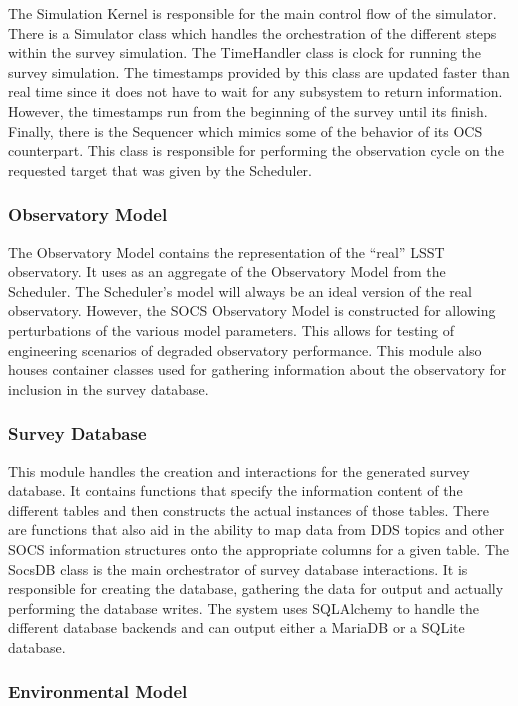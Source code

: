 \documentclass[]{spie}  %
\begin{document}
The Simulation Kernel is responsible for the main control flow of the simulator. There is a Simulator class which handles the orchestration of the different steps within the survey simulation. The TimeHandler class is clock for running the survey simulation. The timestamps provided by this class are updated faster than real time since it does not have to wait for any subsystem to return information. However, the timestamps run from the beginning of the survey until its finish. Finally, there is the Sequencer which mimics some of the behavior of its OCS counterpart. This class is responsible for performing the observation cycle on the requested target that was given by the Scheduler. 

\subsubsection{Observatory Model}

The Observatory Model contains the representation of the ``real'' LSST observatory. It uses as an aggregate of the Observatory Model from the Scheduler. The Scheduler's model will always be an ideal version of the real observatory. However, the SOCS Observatory Model is constructed for allowing perturbations of the various model parameters. This allows for testing of engineering scenarios of degraded observatory performance. This module also houses container classes used for gathering information about the observatory for inclusion in the survey database. 

\subsubsection{Survey Database}

This module handles the creation and interactions for the generated survey database. It contains functions that specify the information content of the different tables and then constructs the actual instances of those tables. There are functions that also aid in the ability to map data from DDS topics and other SOCS information structures onto the appropriate columns for a given table. The SocsDB class is the main orchestrator of survey database interactions. It is responsible for creating the database, gathering the data for output and actually performing the database writes. The system uses SQLAlchemy\cite{SQLAlchemy} to handle the different database backends and can output either a MariaDB\cite{MariaDB} or a SQLite\cite{SQLite} database.

\subsubsection{Environmental Model}
\end{document}

